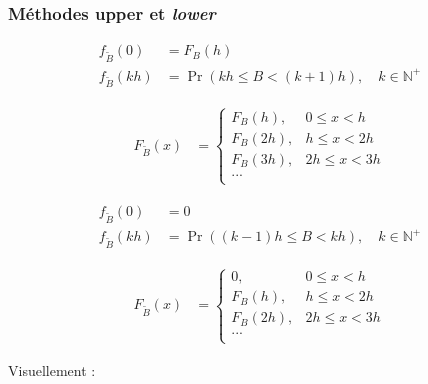 \documentclass[10pt, french]{article}
\begin{document}
\begin{multicols*}{2}
\subsubsection{Méthodes \textbf{upper} et \textit{lower}}
\begin{definitionNOHFILLprop}
\begin{align*}
	f_{\tilde{B}}(0)
	&=	F_{B}(h)	\\
	f_{\tilde{B}}(kh)
	&=	\Pr(kh	\leq	B	<	(k + 1)h), \quad k \in \mathbb{N}^{+}
\end{align*}

\begin{align*}
	F_{\tilde{B}}(x)
	&=	\begin{cases}
		F_{B}(h),	&	0	\leq	x	<	h	\\
		F_{B}(2h),	&	h	\leq	x	<	2h	\\
		F_{B}(3h),	&	2h	\leq	x	<	3h	\\
		...	&	\\
		\end{cases}
\end{align*}
\end{definitionNOHFILLprop}

\begin{definitionNOHFILLprop}
\begin{align*}
	f_{\tilde{B}}(0)
	&=	0	\\
	f_{\tilde{B}}(kh)
	&=	\Pr((k - 1)h	\leq	B	<	kh), \quad k \in \mathbb{N}^{+}
\end{align*}

\begin{align*}
	F_{\tilde{B}}(x)
	&=	\begin{cases}
		0,	&	0	\leq	x	<	h	\\
		F_{B}(h),	&	h	\leq	x	<	2h	\\
		F_{B}(2h),	&	2h	\leq	x	<	3h	\\
		...	&	\\
		\end{cases}
\end{align*}
\end{definitionNOHFILLprop}

Visuellement :
\begin{center}


\begin{tikzpicture}[x=0.75pt,y=0.75pt,yscale=-1,xscale=1]


\end{tikzpicture}
\end{center}
\end{multicols*}
\end{document}
